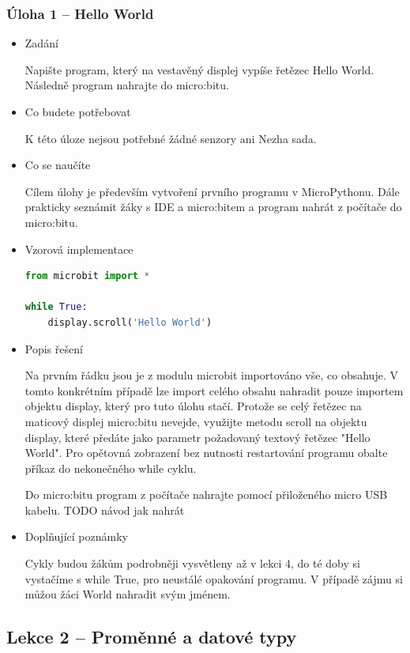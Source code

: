 \documentclass[
  digital,     %
  oneside,     %
  nosansbold,  %
  colorbold, %
  lof,         %
  nolot,         %
]{fithesis4}
\begin{document}
\subsubsection{Úloha 1 -- Hello World}
\begin{itemize}
    \item Zadání

Napište program, který na vestavěný displej vypíše řetězec Hello World. Následně program nahrajte do micro:bitu.
    \item Co budete potřebovat

K této úloze nejsou potřebné žádné senzory ani Nezha sada.
    \item Co se naučíte

Cílem úlohy je především vytvoření prvního programu v MicroPythonu. Dále prakticky seznámit žáky s IDE a micro:bitem a program nahrát z počítače do micro:bitu.
    \item Vzorová implementace
\begin{lstlisting}[language=Python, caption=Úloha 1 - Hello World]
from microbit import *

while True:
    display.scroll('Hello World')
\end{lstlisting}
    \item Popis řešení

Na prvním řádku jsou je z modulu microbit importováno vše, co obsahuje. V tomto konkrétním případě lze import celého obsahu nahradit pouze importem objektu display, který pro tuto úlohu stačí. Protože se celý řetězec na maticový displej micro:bitu nevejde, využijte metodu scroll na objektu display, které předáte jako parametr požadovaný textový řetězec "Hello World". Pro opětovná zobrazení bez nutnosti restartování programu obalte příkaz do nekonečného while cyklu.

Do micro:bitu program z počítače nahrajte pomocí přiloženého micro USB kabelu. TODO návod jak nahrát
    \item Doplňující poznámky

Cykly budou žákům podrobněji vysvětleny až v lekci 4, do té doby si vystačíme s while True, pro neustálé opakování programu. V případě zájmu si můžou žáci World nahradit svým jménem.
\end{itemize}

\subsection{Lekce 2 -- Proměnné a datové typy}
\end{document}
